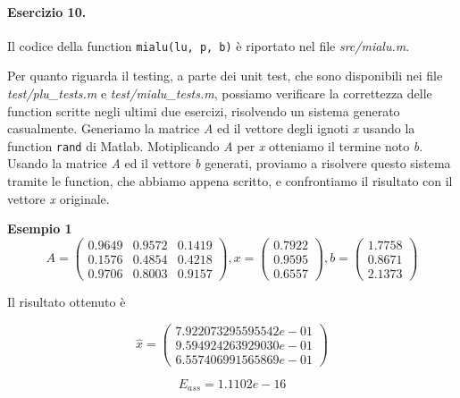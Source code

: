 \paragraph{Esercizio 10.} Il codice della function \verb|mialu(lu, p, b)| è riportato nel file \emph{src/mialu.m}.

Per quanto riguarda il testing, a parte dei unit test, che sono disponibili nei file \emph{test/plu\_tests.m} e \emph{test/mialu\_tests.m}, possiamo verificare la correttezza delle function scritte negli ultimi due esercizi, risolvendo un sistema generato casualmente. Generiamo la matrice \emph{A} ed il vettore degli ignoti \emph{x} usando la function \verb|rand| di Matlab. Motiplicando \emph{A} per \emph{x} otteniamo il termine noto \emph{b}. Usando la matrice \emph{A} ed il vettore \emph{b} generati, proviamo a risolvere questo sistema tramite le function, che abbiamo appena scritto, e confrontiamo il risultato con il vettore \emph{x} originale.

\textbf{Esempio 1}
\[
A = \begin{pmatrix}
0.9649 & 0.9572 & 0.1419\\
0.1576 & 0.4854 & 0.4218\\
0.9706 & 0.8003 & 0.9157
\end{pmatrix}, x = \begin{pmatrix}
0.7922\\
0.9595\\
0.6557
\end{pmatrix}, b = \begin{pmatrix}
1.7758\\
0.8671\\
2.1373
\end{pmatrix}
\]

Il risultato ottenuto è

\[
\hat{x} = \begin{pmatrix}
7.922073295595542e-01\\
9.594924263929030e-01\\
6.557406991565869e-01
\end{pmatrix}
\]

\[
E_{ass} = 1.1102e-16
\]

